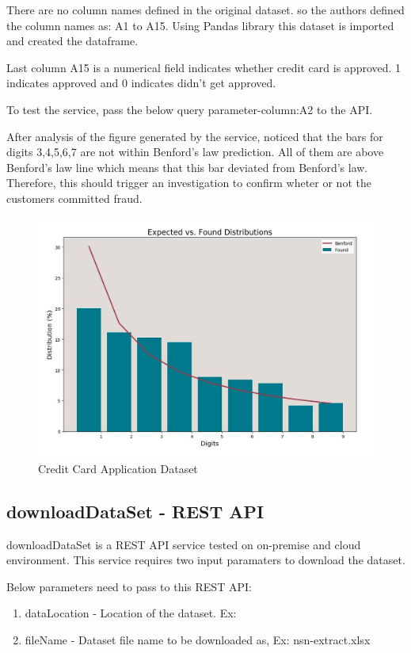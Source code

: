 There are no column names defined in the original dataset.
so the authors defined the column names as:
A1 to A15. Using Pandas library this dataset
is imported and created the dataframe.

Last column A15 is a numerical field 
indicates whether credit card is approved. 
1 indicates approved and 0 indicates didn't 
get approved.

To test the service, pass the below query
parameter-column:A2 to the API.


After analysis of the figure generated 
by the service, noticed that the bars 
for digits 3,4,5,6,7 are not within 
Benford's law prediction. 
All of them are above Benford's law 
line which means that this bar deviated 
from Benford's law. 
Therefore, this should trigger an investigation 
to confirm wheter or not the customers committed fraud. 

\begin{figure}[!ht]
\centering\includegraphics[width=\columnwidth]{images/fraudDet_cc_data.JPG}
  \caption{Credit Card Application Dataset}\label{f:aust-cc-data}
\end{figure}


\subsection{downloadDataSet - REST API}
downloadDataSet is a REST API service tested on 
on-premise and cloud environment. This service requires two 
input paramaters to download the dataset.

Below parameters need to pass to this REST API:

\begin{enumerate}
\item dataLocation - Location of the dataset. 
 Ex:~\cite{hid-sp18-514-excelDatalocation}
\item fileName - Dataset file name to be downloaded 
 as, Ex: nsn-extract.xlsx
\end{enumerate}


